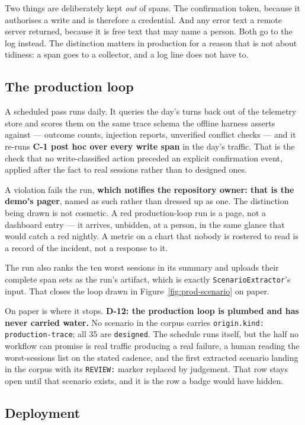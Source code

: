 \documentclass[11pt,a4paper]{article}
\newcommand{\finding}[1]{{\color{primaryblue}\textbf{#1}}}
\begin{document}
Two things are deliberately kept \emph{out} of spans. The confirmation token, because it authorises a write and is therefore a credential. And any error text a remote server returned, because it is free text that may name a person. Both go to the log instead. The distinction matters in production for a reason that is not about tidiness: a span goes to a collector, and a log line does not have to.

\subsection{The production loop}

A scheduled pass runs daily. It queries the day's turns back out of the telemetry store and scores them on the same trace schema the offline harness asserts against --- outcome counts, injection reports, unverified conflict checks --- and it re-runs \textbf{C-1 post hoc over every write span} in the day's traffic. That is the check that no write-classified action preceded an explicit confirmation event, applied after the fact to real sessions rather than to designed ones.

A violation fails the run, \finding{which notifies the repository owner: that is the demo's pager}, named as such rather than dressed up as one. The distinction being drawn is not cosmetic. A red production-loop run is a page, not a dashboard entry --- it arrives, unbidden, at a person, in the same glance that would catch a red nightly. A metric on a chart that nobody is rostered to read is a record of the incident, not a response to it.

The run also ranks the ten worst sessions in its summary and uploads their complete span sets as the run's artifact, which is exactly \texttt{ScenarioExtractor}'s input. That closes the loop drawn in Figure~\ref{fig:prod-scenario} on paper.

On paper is where it stops. \textbf{D-12: the production loop is plumbed and has never carried water.} No scenario in the corpus carries \texttt{origin.kind: production-trace}; all 35 are \texttt{designed}. The schedule runs itself, but the half no workflow can promise is real traffic producing a real failure, a human reading the worst-sessions list on the stated cadence, and the first extracted scenario landing in the corpus with its \texttt{REVIEW:} marker replaced by judgement. That row stays open until that scenario exists, and it is the row a badge would have hidden.

\subsection{Deployment}
\end{document}
